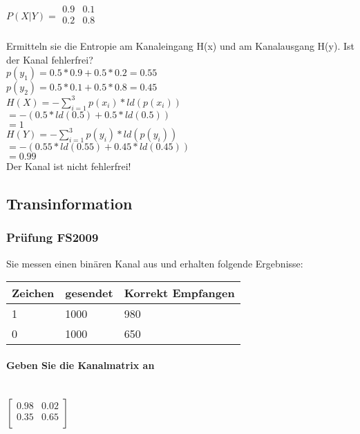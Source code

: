 $P(X|Y) = \begin{matrix}
    0.9 & 0.1\\
    0.2 & 0.8\\
\end{matrix}$

Ermitteln sie die Entropie am Kanaleingang H(x) und am Kanalausgang H(y). Ist der Kanal fehlerfrei?\\
$p(y_1)=0.5*0.9+0.5*0.2=0.55$\\
$p(y_2)=0.5*0.1+0.5*0.8=0.45$\\

$H(X)=-\sum_{i=1}^3p(x_i)*ld(p(x_i))$\\
$=-(0.5*ld(0.5)+0.5*ld(0.5))$\\
$=1$\\

$H(Y)=-\sum_{i=1}^3p(y_i)*ld(p(y_i))$\\
$=-(0.55*ld(0.55)+0.45*ld(0.45))$\\
$=0.99$\\

Der Kanal ist nicht fehlerfrei!

\subsection{Transinformation}
\subsubsection{Prüfung FS2009}
Sie messen einen binären Kanal aus und erhalten folgende Ergebnisse:\\

\begin{center}
    \centering
    \begin{tabular}{l | l | l}
        \bfseries{Zeichen} & \bfseries{gesendet}& \bfseries{Korrekt Empfangen}\\ \hline
        1 & 1000 & 980\\ 
        0 & 1000 & 650
    \end{tabular}
\end{center}

\paragraph{Geben Sie die Kanalmatrix an}\mbox{}\\

$\begin{bmatrix}
    0.98 & 0.02\\
    0.35 & 0.65\\
\end{bmatrix}$

